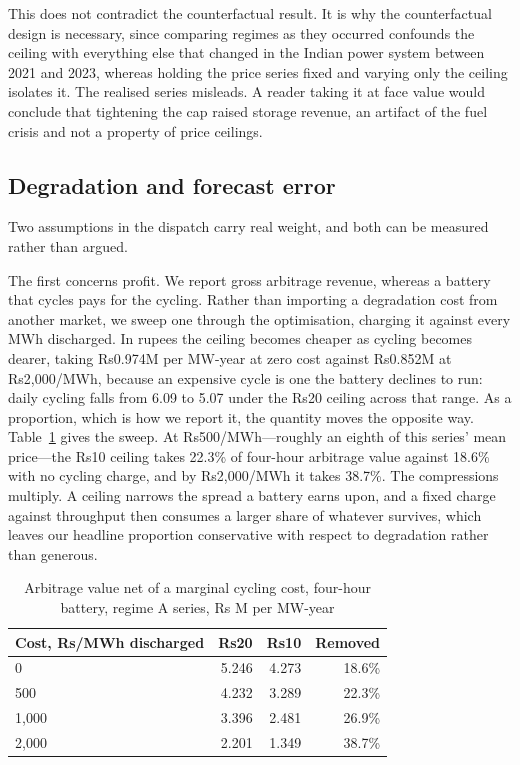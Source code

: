 \documentclass[conference,a4paper]{IEEEtran}
\begin{document}
This does not contradict the counterfactual result. It is why the counterfactual
design is necessary, since comparing regimes as they occurred confounds the
ceiling with everything else that changed in the Indian power system between
2021 and 2023, whereas holding the price series fixed and varying only the
ceiling isolates it. The realised series misleads. A reader taking it at face
value would conclude that tightening the cap raised storage revenue, an artifact
of the fuel crisis and not a property of price ceilings.

\subsection{Degradation and forecast error}

Two assumptions in the dispatch carry real weight, and both can be measured
rather than argued.

The first concerns profit. We report gross arbitrage revenue, whereas a battery
that cycles pays for the cycling. Rather than importing a degradation cost from
another market, we sweep one through the optimisation, charging it against every
MWh discharged. In rupees the ceiling becomes cheaper as cycling becomes dearer,
taking Rs0.974M per MW-year at zero cost against Rs0.852M at Rs2,000/MWh,
because an expensive cycle is one the battery declines to run: daily cycling
falls from 6.09 to 5.07 under the Rs20 ceiling across that range. As a
proportion, which is how we report it, the quantity moves the opposite way.
Table~\ref{tab:deg} gives the sweep. At Rs500/MWh---roughly an eighth of this
series' mean price---the Rs10 ceiling takes 22.3\% of four-hour arbitrage value
against 18.6\% with no cycling charge, and by Rs2,000/MWh it takes 38.7\%. The
compressions multiply. A ceiling narrows the spread a battery earns upon, and a
fixed charge against throughput then consumes a larger share of whatever
survives, which leaves our headline proportion conservative with respect to
degradation rather than generous.

\begin{table}[htbp]
\caption{Arbitrage value net of a marginal cycling cost, four-hour battery,
regime A series, Rs M per MW-year}
\label{tab:deg}
\centering
\begin{tabular}{lrrr}
\hline
\textbf{Cost, Rs/MWh discharged} & \textbf{Rs20} & \textbf{Rs10} & \textbf{Removed}\\
\hline
0 & 5.246 & 4.273 & 18.6\%\\
500 & 4.232 & 3.289 & 22.3\%\\
1,000 & 3.396 & 2.481 & 26.9\%\\
2,000 & 2.201 & 1.349 & 38.7\%\\
\hline
\end{tabular}
\end{table}
\end{document}
